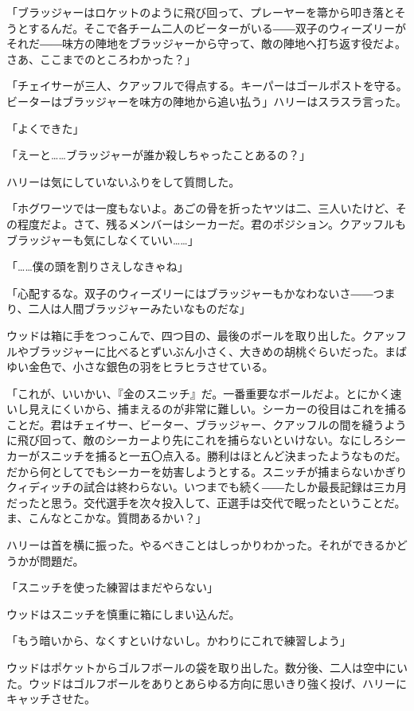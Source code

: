 \documentclass[10pt,a4paper]{article}
\begin{document}
\begin{CJK}{UTF8}{min}
「ブラッジャーはロケットのように飛び回って、プレーヤーを箒から叩き落とそうとするんだ。そこで各チーム二人のビーターがいる――双子のウィーズリーがそれだ――味方の陣地をブラッジャーから守って、敵の陣地へ打ち返す役だよ。さあ、ここまでのところわかった？」

「チェイサーが三人、クアッフルで得点する。キーパーはゴールポストを守る。ビーターはブラッジャーを味方の陣地から追い払う」ハリーはスラスラ言った。

「よくできた」

「えーと……ブラッジャーが誰か殺しちゃったことあるの？」

ハリーは気にしていないふりをして質問した。

「ホグワーツでは一度もないよ。あごの骨を折ったヤツは二、三人いたけど、その程度だよ。さて、残るメンバーはシーカーだ。君のポジション。クアッフルもブラッジャーも気にしなくていい……」

「……僕の頭を割りさえしなきゃね」

「心配するな。双子のウィーズリーにはブラッジャーもかなわないさ――つまり、二人は人間ブラッジャーみたいなものだな」

ウッドは箱に手をつっこんで、四つ目の、最後のボールを取り出した。クアッフルやブラッジャーに比べるとずいぶん小さく、大きめの胡桃ぐらいだった。まばゆい金色で、小さな銀色の羽をヒラヒラさせている。

「これが、いいかい、『金のスニッチ』だ。一番重要なボールだよ。とにかく速いし見えにくいから、捕まえるのが非常に難しい。シーカーの役目はこれを捕ることだ。君はチェイサー、ビーター、ブラッジャー、クアッフルの間を縫うように飛び回って、敵のシーカーより先にこれを捕らないといけない。なにしろシーカーがスニッチを捕ると一五〇点入る。勝利はほとんど決まったようなものだ。だから何としてでもシーカーを妨害しようとする。スニッチが捕まらないかぎりクィディッチの試合は終わらない。いつまでも続く――たしか最長記録は三カ月だったと思う。交代選手を次々投入して、正選手は交代で眠ったということだ。ま、こんなとこかな。質問あるかい？」

ハリーは首を横に振った。やるべきことはしっかりわかった。それができるかどうかが問題だ。

「スニッチを使った練習はまだやらない」

ウッドはスニッチを慎重に箱にしまい込んだ。

「もう暗いから、なくすといけないし。かわりにこれで練習しよう」

ウッドはポケットからゴルフボールの袋を取り出した。数分後、二人は空中にいた。ウッドはゴルフボールをありとあらゆる方向に思いきり強く投げ、ハリーにキャッチさせた。


\end{CJK}
\end{document}
